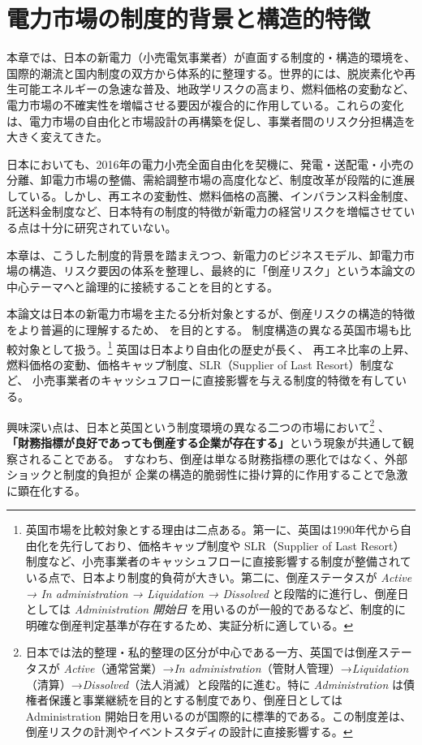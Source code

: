 
\chapter[電力市場の制度的背景]{電力市場の制度的背景と構造的特徴}

本章では、日本の新電力（小売電気事業者）が直面する制度的・構造的環境を、国際的潮流と国内制度の双方から体系的に整理する。世界的には、脱炭素化や再生可能エネルギーの急速な普及、地政学リスクの高まり、燃料価格の変動など、電力市場の不確実性を増幅させる要因が複合的に作用している。これらの変化は、電力市場の自由化と市場設計の再構築を促し、事業者間のリスク分担構造を大きく変えてきた。

日本においても、2016年の電力小売全面自由化を契機に、発電・送配電・小売の分離、卸電力市場の整備、需給調整市場の高度化など、制度改革が段階的に進展している。しかし、再エネの変動性、燃料価格の高騰、インバランス料金制度、託送料金制度など、日本特有の制度的特徴が新電力の経営リスクを増幅させている点は十分に研究されていない。

本章は、こうした制度的背景を踏まえつつ、新電力のビジネスモデル、卸電力市場の構造、リスク要因の体系を整理し、最終的に「倒産リスク」という本論文の中心テーマへと論理的に接続することを目的とする。

\vspace{1em}

本論文は日本の新電力市場を主たる分析対象とするが、倒産リスクの構造的特徴をより普遍的に理解するため、
を目的とする。  制度構造の異なる英国市場も比較対象として扱う。\footnote{英国市場を比較対象とする理由は二点ある。第一に、英国は1990年代から自由化を先行しており、価格キャップ制度や SLR（Supplier of Last Resort）制度など、小売事業者のキャッシュフローに直接影響する制度が整備されている点で、日本より制度的負荷が大きい。第二に、倒産ステータスが \textit{Active → In administration → Liquidation → Dissolved} と段階的に進行し、倒産日としては \textit{Administration 開始日} を用いるのが一般的であるなど、制度的に明確な倒産判定基準が存在するため、実証分析に適している。}
英国は日本より自由化の歴史が長く、
再エネ比率の上昇、燃料価格の変動、価格キャップ制度、SLR（Supplier of Last Resort）制度など、
小売事業者のキャッシュフローに直接影響を与える制度的特徴を有している。

興味深い点は、日本と英国という制度環境の異なる二つの市場において\footnote{日本では法的整理・私的整理の区分が中心である一方、英国では倒産ステータスが \textit{Active}（通常営業）→\textit{In administration}（管財人管理）→\textit{Liquidation}（清算）→\textit{Dissolved}（法人消滅）と段階的に進む。特に \textit{Administration} は債権者保護と事業継続を目的とする制度であり、倒産日としては Administration 開始日を用いるのが国際的に標準的である。この制度差は、倒産リスクの計測やイベントスタディの設計に直接影響する。}
、
\textbf{「財務指標が良好であっても倒産する企業が存在する」}という現象が共通して観察されることである。
すなわち、倒産は単なる財務指標の悪化ではなく、外部ショックと制度的負担が
企業の構造的脆弱性に掛け算的に作用することで急激に顕在化する。

